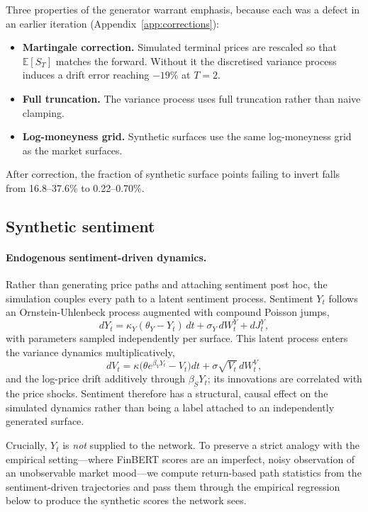 \documentclass[11pt,a4paper]{article}
\begin{document}
Three properties of the generator warrant emphasis, because each was a defect in
an earlier iteration (Appendix~\ref{app:corrections}):
\begin{itemize}
\item \textbf{Martingale correction.} Simulated terminal prices are rescaled so
that $\mathbb{E}[S_T]$ matches the forward. Without it the discretised variance
process induces a drift error reaching $-19\%$ at $T=2$.
\item \textbf{Full truncation.} The variance process uses full truncation
\citep{lord2010} rather than naive clamping.
\item \textbf{Log-moneyness grid.} Synthetic surfaces use the same log-moneyness
grid as the market surfaces.
\end{itemize}
After correction, the fraction of synthetic surface points failing to invert
falls from 16.8--37.6\% to 0.22--0.70\%.

\subsection{Synthetic sentiment}
\label{sec:synthsent}

\paragraph{Endogenous sentiment-driven dynamics.}
Rather than generating price paths and attaching sentiment post hoc, the
simulation couples every path to a latent sentiment process. Sentiment $Y_t$
follows an Ornstein-Uhlenbeck process augmented with compound Poisson jumps,
\begin{equation}
dY_t = \kappa_Y(\theta_Y - Y_t)\,dt + \sigma_Y\,dW_t^Y + dJ_t^Y ,
\end{equation}
with parameters sampled independently per surface. This latent process enters
the variance dynamics multiplicatively,
\begin{equation}
dV_t = \kappa\bigl(\theta e^{\beta_V Y_t} - V_t\bigr)dt
       + \sigma\sqrt{V_t}\,dW_t^V ,
\end{equation}
and the log-price drift additively through $\beta_S Y_t$; its innovations are
correlated with the price shocks. Sentiment therefore has a structural, causal
effect on the simulated dynamics rather than being a label attached to an
independently generated surface.

Crucially, $Y_t$ is \emph{not} supplied to the network. To preserve a strict
analogy with the empirical setting---where FinBERT scores are an imperfect,
noisy observation of an unobservable market mood---we compute return-based path
statistics from the sentiment-driven trajectories and pass them through the
empirical regression below to produce the synthetic scores the network sees.
\end{document}
